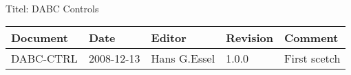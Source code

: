 \\Titel: DABC Controls
\begin{table}[h]
\begin{tabular}{|p{2.8cm}|p{2.0cm}|p{3.0cm}|p{1.6cm}|p{5.0cm}|} \hline
Document   & Date        & Editor       & Revision & Comment \\
\hline DABC-CTRL & 2008-12-13 & Hans G.Essel & 1.0.0      &
First scetch \\ \hline
\end{tabular}
\end{table}
